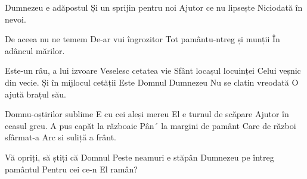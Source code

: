 
\beginverse
Dumnezeu e adăpostul
Și un sprijin pentru noi
Ajutor ce nu lipsește
Niciodată în nevoi.
\endverse

\beginchorus
De aceea nu ne temem
De-ar vui îngrozitor
Tot pamântu-ntreg și munții
În adâncul mărilor.
\endchorus

\beginverse
Este-un râu, a lui izvoare
Veselesc cetatea vie
Sfânt locașul locuinței
Celui veșnic din vecie.
Și în mijlocul cetății
Este Domnul Dumnezeu
Nu se clatin vreodată
O ajută brațul său.
\endverse

\beginverse
Domnu-oștirilor sublime
E cu cei aleși mereu
El e turnul de scăpare
Ajutor în ceasul greu.
A pus capăt la războaie
Pân´ la margini de pamânt
Care de război sfârmat-a
Arc si suliță a frânt.
\endverse

\beginverse
Vă opriți, să știți că Domnul
Peste neamuri e stăpân
Dumnezeu pe întreg pamântul
Pentru cei ce-n El ramân? 
\endverse

\endsong

